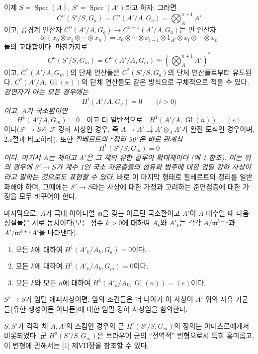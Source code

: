 이제 $S=\operatorname{Spec}(A)$,
$S'=\operatorname{Spec}(A')$라고 하자. 그러면
\[
  C^n(S'/S,G_a)=C^n(A'/A,G_a)=\bigotimes_A^{n+1}A'
\]
이고, 공경계 연산자
$C^n(A'/A,G_a)\longrightarrow C^{n+1}(A'/A,G_a)$는 면 연산자
\[
  \partial_i(x_0\otimes x_1\otimes\cdots\otimes x_n)
  =x_0\otimes\cdots\otimes x_{i-1}\otimes1_{A'}\otimes
   x_i\otimes\cdots\otimes x_n
\]
들의 교대합이다. 마찬가지로
\[
  C^n(S'/S,G_m)=C^n(A'/A,G_m)
  \simeq\left(\bigotimes_A^{n+1}A'\right)^*
\]
이고, $C^*(A'/A,G_m)$의 단체 연산들은
$C^*(S'/S,G_a)$의 단체 연산들로부터 유도된다.
\linebreak $C^*(A'/A,\operatorname{Gl}(n))$의 단체 연산들도 같은 방식으로
구체적으로 적을 수 있다. \emph{강연자가 아는 모든 경우에는}
\[
  H^i(A'/A,G_a)=0\qquad\text{($i>0$)}
\]
\emph{이고, $A$가 국소환이면}
\[
  H^1(A'/A,G_m)=0
  \quad\text{이고 더 일반적으로}\quad
  H^1(A'/A,\operatorname{Gl}(n))=(e)
\]
이다($S'\longrightarrow S$가 $\mathcal F$-강하 사상인 경우, 즉
$A\longrightarrow A'\rightrightarrows A'\otimes_AA'$가 완전 도식인
경우이며, 2.c절과 비교하라). 또한 \emph{힐베르트의 “정리 90”은 바로
관계식}
\[
  H^1(S'/S,G_m)=0
\]
\emph{이다. 여기서 $A$는 체이고 $A'$은 그 체의 유한 갈루아 확대체이다
(예 1 참조). 이는 위의 경우에 $S'\longrightarrow S$가 계수 1인
국소 자유층들의 섬유화 범주에 대한 엄밀 강하 사상이라고 말하는 것으로도
표현할 수 있다.} 바로 이 마지막 형태로 힐베르트의 정리를 일반화해야 하며,
그때에는 $S'\longrightarrow S$라는 사상에 대한 가정과 고려하는
준연접층에 대한 가정을 모두 바꾸어야 한다.

마지막으로, $A$가 극대 아이디얼 $\mathfrak m$을 갖는 아르틴 국소환이고
$A'$이 $A$-대수일 때 다음 성질들은 서로 동치이다(모든 정수 $k>0$에
대하여 $A_k$와 $A'_k$는 각각
$A/\mathfrak m^{k+1}$과 $A'/\mathfrak m^{k+1}A'$을 나타낸다).
\begin{enumerate}
\item[(i)] 모든 $k$에 대하여 $H^1(A'_k/A_k,G_a)=0$이다.
\item[(ii)] 모든 $k$에 대하여 $H^1(A'_k/A_k,G_m)=0$이다.
\item[(iii)] 모든 $k$와 모든 $n$에 대하여
$H^1(A'_k/A_k,\operatorname{Gl}(n))=(e)$이다.
\end{enumerate}
$S'\longrightarrow S$가 엄밀 에피사상이면, 앞의 조건들은 더 나아가 이
사상이 $A'$ 위의 자유 가군들(유한 생성이든 아니든)에 대한 엄밀 강하
사상임을 함의한다.

 $S,S'$가 각각 체 $A,A'$의 스킴인 경우의 군
$H^i(S'/S,G_m)$의 정의는 아미츠르에게서 비롯되었다. 군
$H^2(S'/S,G_m)$은 브라우어 군의 “전역적” 변형으로서 특히 흥미롭고,
이 변형에 관해서는 [1] 제VII장을 참조할 수 있다.

